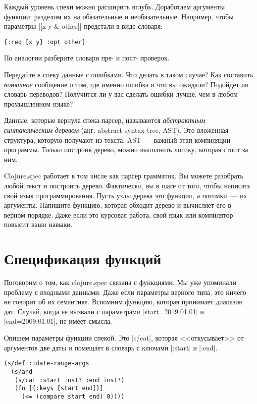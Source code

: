 Каждый уровень спеки можно расширить вглубь. Доработаем аргументы функции:
разделим их на обязательные и необязательные. Например, чтобы параметры
\spverb|[x y & other]| предстали в виде словаря:

\begin{verbatim}
{:req [x y] :opt other}
\end{verbatim}

\noindent
По аналогии разберите словари пре- и пост- проверок.

Передайте в спеку данные с ошибками. Что делать в таком случае? Как составить
\emph{понятное} сообщение о том, где именно ошибка и что вы ожидали? Подойдет ли
словарь переводов? Получится ли у вас сделать ошибки лучше, чем в любом
промышленном языке?

Данные, которые вернула спека-парсер, называются \emph{абстрактным синтаксическим деревом}
(анг. abstract syntax tree, AST). Это вложенная структура, которую получают из текста.
AST~--- важный этап компиляции программы. Только построив дерево, можно выполнить логику,
которая стоит за ним.

Clojure.spec работает в том числе как парсер грамматик. Вы можете разобрать
любой текст и построить дерево. Фактически, вы в шаге от того, чтобы написать
свой язык программирования. Пусть узлы дерева это функции, а потомки~--- их
аргументы. Напишите функцию, которая обходит дерево и вычисляет его в верном
порядке. Даже если это курсовая работа, свой язык или компилятор повысит ваши
навыки.

\section{Спецификация функций}

Поговорим о том, как clojure.spec связана с функциями. Мы уже упоминали проблему
с входными данными. Даже если параметры верного типа, это ничего не говорит об
их семантике. Вспомним функцию, которая принимает диапазон дат. Случай, когда ее
вызвали с параметрами \spverb|start=2019.01.01| и \spverb|end=2009.01.01|, не
имеет смысла.

Опишем параметры функции спекой. Это \spverb|s/cat|, которая <<откусывает>> от
аргументов две даты и помещает в словарь с ключами \spverb|:start| и
\spverb|:end|.

\begin{verbatim}
(s/def ::date-range-args
  (s/and
   (s/cat :start inst? :end inst?)
   (fn [{:keys [start end]}]
     (<= (compare start end) 0))))
\end{verbatim}

